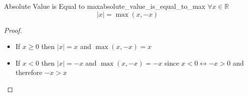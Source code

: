 \begin{lemma}{Absolute Value is Equal to max}{absolute_value_is_equal_to_max}
    $ \forall x \in \mathbb{R}$ 
    \[
    \left| x \right| =  \max\left(x,  - x\right)
    \]
\end{lemma}
\begin{proof}
    \begin{itemize}
        \item If $ x \ge 0$ then $ \left| x \right| = x$  and $ \max\left(x, -x\right) = x$ 
        \item If $ x < 0$ then $ \left| x \right| =   - x$ and $ \max\left(x, -x\right) = -x$ since $ x < 0 \leftrightarrow  - x > 0$ and therefore $  - x > x$ 
    \end{itemize}
\end{proof}
